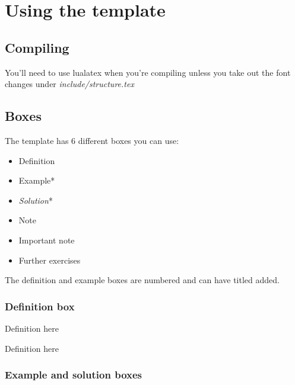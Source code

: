 \documentclass[11pt,a4paper,twoside]{report}
\begin{document}
\ShowClozetrue

\tableofcontents

\chapter{Using the template}

\section{Compiling}

\begin{important}
You'll need to use lualatex when you're compiling unless you take out the font changes under \textit{include/structure.tex}
\end{important}

\section{Boxes}

The template has 6 different boxes you can use:
\begin{itemize}
  \item Definition
  \item Example*
  \item \textit{Solution}*%
  \item Note
  \item Important note
  \item Further exercises
\end{itemize}
The definition and example boxes are numbered and can have titled added.

\subsection{Definition box}

\begin{definition}[Title]
  Definition here
\end{definition}

\begin{definition}
  Definition here
\end{definition}

\subsection{Example and solution boxes}
\end{document}
